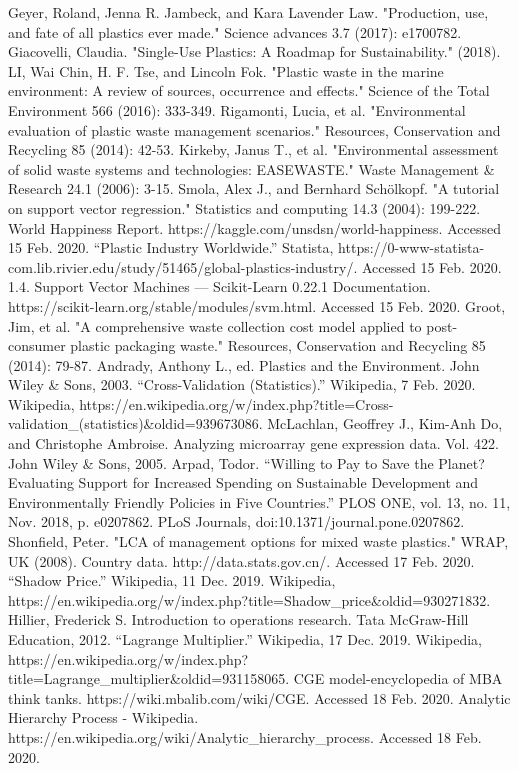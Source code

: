\documentclass{mcmthesis}
\begin{document}
\begin{thebibliography}{99}
 Geyer, Roland, Jenna R. Jambeck, and Kara Lavender Law. "Production, use, and fate of all plastics ever made." Science advances 3.7 (2017): e1700782.
 Giacovelli, Claudia. "Single-Use Plastics: A Roadmap for Sustainability." (2018).
LI, Wai Chin, H. F. Tse, and Lincoln Fok. "Plastic waste in the marine environment: A review of sources, occurrence and effects." Science of the Total Environment 566 (2016): 333-349.
Rigamonti, Lucia, et al. "Environmental evaluation of plastic waste management scenarios." Resources, Conservation and Recycling 85 (2014): 42-53.
Kirkeby, Janus T., et al. "Environmental assessment of solid waste systems and technologies: EASEWASTE." Waste Management \& Research 24.1 (2006): 3-15.
Smola, Alex J., and Bernhard Schölkopf. "A tutorial on support vector regression." Statistics and computing 14.3 (2004): 199-222.
World Happiness Report. https://kaggle.com/unsdsn/world-happiness. Accessed 15 Feb. 2020.
“Plastic Industry Worldwide.” Statista, https://0-www-statista-com.lib.rivier.edu/study/51465/global-plastics-industry/. Accessed 15 Feb. 2020.
1.4. Support Vector Machines — Scikit-Learn 0.22.1 Documentation. https://scikit-learn.org/stable/modules/svm.html. Accessed 15 Feb. 2020.
Groot, Jim, et al. "A comprehensive waste collection cost model applied to post-consumer plastic packaging waste." Resources, Conservation and Recycling 85 (2014): 79-87.
Andrady, Anthony L., ed. Plastics and the Environment. John Wiley \& Sons, 2003.
“Cross-Validation (Statistics).” Wikipedia, 7 Feb. 2020. Wikipedia, https://en.wikipedia.org/w/index.php?title=Cross-validation\_(statistics)\&oldid=939673086.
McLachlan, Geoffrey J., Kim-Anh Do, and Christophe Ambroise. Analyzing microarray gene expression data. Vol. 422. John Wiley \& Sons, 2005.
Arpad, Todor. “Willing to Pay to Save the Planet? Evaluating Support for Increased Spending on Sustainable Development and Environmentally Friendly Policies in Five Countries.” PLOS ONE, vol. 13, no. 11, Nov. 2018, p. e0207862. PLoS Journals, doi:10.1371/journal.pone.0207862.
Shonfield, Peter. "LCA of management options for mixed waste plastics." WRAP, UK (2008).
Country data. http://data.stats.gov.cn/. Accessed 17 Feb. 2020.
“Shadow Price.” Wikipedia, 11 Dec. 2019. Wikipedia, https://en.wikipedia.org/w/index.php?title=Shadow\_price\&oldid=930271832.
Hillier, Frederick S. Introduction to operations research. Tata McGraw-Hill Education, 2012.
“Lagrange Multiplier.” Wikipedia, 17 Dec. 2019. Wikipedia, https://en.wikipedia.org/w/index.php?title=Lagrange\_multiplier\&oldid=931158065.
CGE model-encyclopedia of MBA think tanks. https://wiki.mbalib.com/wiki/CGE. Accessed 18 Feb. 2020.
Analytic Hierarchy Process - Wikipedia. https://en.wikipedia.org/wiki/Analytic\_hierarchy\_process. Accessed 18 Feb. 2020.


\end{thebibliography}

\newpage
\end{document}
